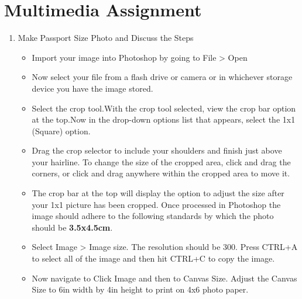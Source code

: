 \documentclass{article}
\newenvironment{problem}{\begin{enumerate}[label=\bfseries\alph*.]\large\bfseries}{\end{enumerate}}
\newenvironment{answered}{\par\normalfont}{}
\begin{document}



\section{Multimedia Assignment}

\noindent
    \begin{problem}
        \item Make Passport Size Photo and Discuss the Steps
            \begin{answered}
                \begin{itemize}
                    \item Import your image into Photoshop by going to File > Open 
                    
                    \item Now select your file from a flash drive or camera or in whichever storage device you have the image stored.
                    
                    \item Select the crop tool.With the crop tool selected, view the crop bar option at the top.Now in the drop-down options list that appears, select the 1x1 (Square) option.
                    
                    \item Drag the crop selector to include your shoulders and finish just above your hairline. To change the size of the cropped area, click and drag the corners, or click and drag anywhere within the cropped area to move it.
                    
                    \item The crop bar at the top will display the option to adjust the size after your 1x1 picture has been cropped. Once processed in Photoshop the image should adhere to the following standards by which the photo should be \textbf{3.5x4.5cm}.
                    
                    \item Select Image > Image size. The resolution should be 300.
                    Press CTRL+A to select all of the image and then hit CTRL+C to copy the image.
                    
                    \item Now navigate to Click Image and then to Canvas Size. Adjust the Canvas Size to 6in width by 4in height to print on 4x6 photo paper.
                    

\end{itemize}
\end{answered}
\end{problem}
\end{document}
